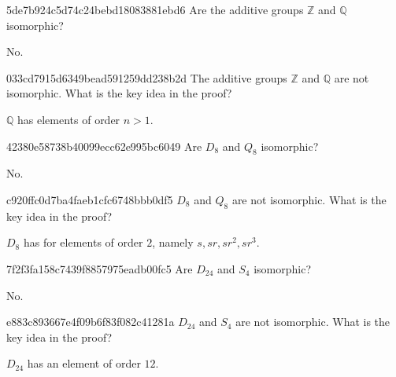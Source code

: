 \begin{note}{5de7b924c5d74c24bebd18083881ebd6}
    Are the additive groups \({ \mathbb Z }\) and \({ \mathbb Q }\) isomorphic?

    \begin{cloze}{1}
        No.
    \end{cloze}
\end{note}

\begin{note}{033cd7915d6349bead591259dd238b2d}
    The additive groups \({ \mathbb Z }\) and \({ \mathbb Q }\) are not isomorphic.
    What is the key idea in the proof?

    \begin{cloze}{1}
        \({ \mathbb Q }\) has elements of order \({ n > 1 }\).
    \end{cloze}
\end{note}

\begin{note}{42380e58738b40099ecc62e995bc6049}
    Are \({ D_8 }\) and \({ Q_8 }\) isomorphic?

    \begin{cloze}{1}
        No.
    \end{cloze}
\end{note}

\begin{note}{c920ffc0d7ba4faeb1cfc6748bbb0df5}
    \({ D_8 }\) and \({ Q_8 }\) are not isomorphic.
    What is the key idea in the proof?

    \begin{cloze}{1}
        \({ D_8 }\) has for elements of order \({ 2 }\), namely \({ s, sr, sr^2, sr^3 }\).
    \end{cloze}
\end{note}

\begin{note}{7f2f3fa158c7439f8857975eadb00fc5}
    Are \({ D_{24} }\) and \({ S_4 }\) isomorphic?

    \begin{cloze}{1}
        No.
    \end{cloze}
\end{note}

\begin{note}{e883c893667e4f09b6f83f082c41281a}
    \({ D_{24} }\) and \({ S_4 }\) are not isomorphic.
    What is the key idea in the proof?

    \begin{cloze}{1}
        \({ D_{24} }\) has an element of order \({ 12 }\).
    \end{cloze}
\end{note}

